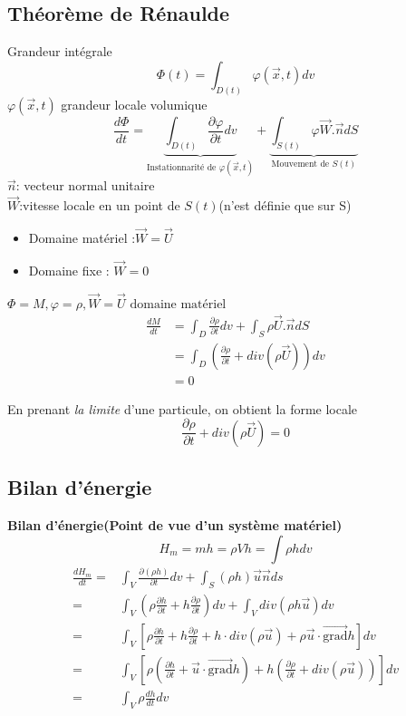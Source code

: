 \documentclass{article}
\begin{document}
\subsection{Th\'eor\`eme de R\'enaulde}
Grandeur int\'egrale
$$
\Phi(t)=\int_{D(t)} \varphi(\vec{x},t)dv
$$
$\varphi(\vec{x},t)$ grandeur locale volumique
$$
\frac{ d\Phi}{dt}=
\underbrace{\int_{D(t)}\frac{\partial \varphi}{\partial t}dv}_{\text{Instationnarit\'e de } \varphi(\vec{x},t)}
+
\underbrace{\int_{S(t)} \varphi \vec{W}.\vec{n}dS}_{\text{Mouvement de }S(t)}
$$
$\vec{n}$: vecteur normal unitaire\\
$\vec{W}$:vitesse locale en un point de $S(t)$(n'est définie que sur S)\\
\begin{itemize}
\item  Domaine mat\'eriel :$\vec{W}=\vec{ U}$
\item  Domaine fixe : $\vec{W}=0$
\end{itemize}

\begin{example}
 $\Phi = M,\varphi=\rho,\vec{ W}=\vec{ U}\text{ domaine mat\'eriel}$
\begin{equation}
	\begin{split}
\frac{ dM}{dt} & =\int_D \frac{\partial \rho}{\partial t}dv+ \int_S \rho \vec{ U}.\vec{ n}dS \\
& = \int_D (\frac{\partial \rho }{\partial t} + div(\rho \vec{ U}))dv \\
& =0	
	\end{split}
\end{equation}

En prenant \emph{la limite} d'une particule, on obtient la forme locale
$$
\frac{\partial \rho }{\partial t} + div(\rho \vec{ U})=0
$$
\end{example}
\subsection{Bilan d'\'energie}
\begin{example}
 \textbf{Bilan d'\'energie(Point de vue d'un syst\`eme mat\'eriel)}
 $$H_m = mh=\rho V h=\int \rho h dv$$
 \begin{equation}
 	\begin{split}
	 \frac{ dH_m}{dt}
	 = & \int_V \frac{\partial (\rho h)}{\partial t}dv+ \int_S (\rho h)\vec{u}\vec{n}ds \\
	 = & \int_V (\rho \frac{\partial h}{\partial t}+ h \frac{ \partial \rho}{\partial t})dv+ \int_V div(\rho h\vec{u})dv \\
	 = & \int_V [\rho \frac{\partial h}{\partial t}+ h \frac{ \partial \rho}{\partial t}+ h\cdot div(\rho \vec{u}) +\rho\vec{u}\cdot \vec{\mbox{grad}} h]dv \\
	 = & \int_V [\rho ( \frac{\partial h}{\partial t} + \vec{u}\cdot \vec{\mbox{grad}} h )+ h (\frac{ \partial \rho}{\partial t}+ div(\rho \vec{u}))]dv \\
	 = & \int_V \rho \frac{ dh}{dt}dv
	\end{split}
\end{equation}
\end{example}
\end{document}
